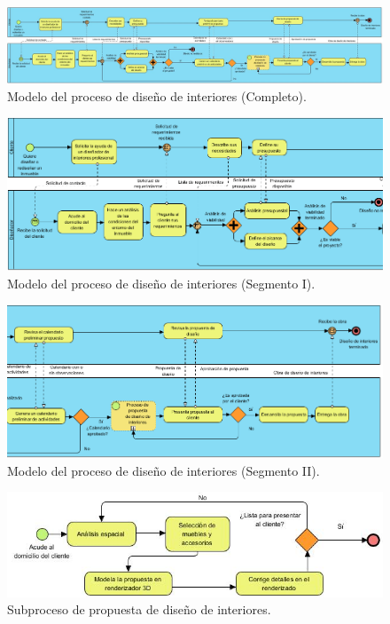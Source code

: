 \begin{figure}[!htbp]
	\centering
	\includegraphics[width=20cm,angle=270,origin=c]{imagenes/marcoteorico/bpmn/proceso_full.jpg}
	\caption{Modelo del proceso de diseño de interiores (Completo).}
	\label{fig:bpmn_antes}
\end{figure}
\newpage

\begin{figure}[!htbp]
	\centering
	\includegraphics[width=19cm,angle=270,origin=c]{imagenes/marcoteorico/bpmn/proceso_01_01_left.png}
	\caption{Modelo del proceso de diseño de interiores (Segmento I).}
	\label{fig:bpmn_antes}
\end{figure}
\newpage

\begin{figure}[!htbp]
	\centering
	\includegraphics[width=19cm,angle=270,origin=c]{imagenes/marcoteorico/bpmn/proceso_02_01_left.png}
	\caption{Modelo del proceso de diseño de interiores (Segmento II).}
	\label{fig:bpmn_antes}
\end{figure}
\newpage

\begin{figure}[!htbp]
	\centering
	\includegraphics[width=16cm]{imagenes/marcoteorico/bpmn/subproceso.jpg}
	\caption{Subproceso de propuesta de diseño de interiores.}
	\label{fig:subproceso}
\end{figure}
\newpage